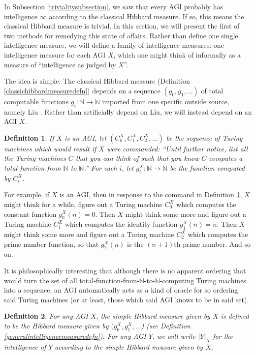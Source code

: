 \documentclass{article}
\newtheorem{definition}{Definition}
\begin{document}
In Subsection \ref{trivialitysubsection}, we saw that every AGI probably has
intelligence $\infty$ according to the classical Hibbard measure. If so, this
means the classical Hibbard measure is trivial. In this section, we will present
the first of two methods for remedying this state of affairs. Rather than define
one single intelligence measure, we will define a family of intelligence measures:
one intelligence measure for each AGI $X$, which one might think of informally as
a measure of ``intelligence as judged by $X$''.

The idea is simple. The classical Hibbard measure
(Definition \ref{classichibbardmeasuredefn}) depends on a sequence $(g_0,g_1,\ldots)$
of total computable functions $g_i:\mathbb N\to\mathbb N$ imported from one specific
outside source, namely Liu \cite{liu1960enumeration}. Rather than artificially depend
on Liu, we will instead depend on an AGI $X$.

\begin{definition}
\label{functionlistdefinition}
    If $X$ is an AGI, let $(C^X_0, C^X_1, C^X_2, \ldots)$ be the sequence of
    Turing machines which would result if $X$ were commanded: ``Until further
    notice, list all the Turing machines $C$ that you can think of such that
    you know $C$ computes a total function from $\mathbb N$ to $\mathbb N$.''
    For each $i$, let $g^X_i:\mathbb N\to\mathbb N$ be the function computed by
    $C^X_i$.
\end{definition}

For example, if $X$ is an AGI, then in response to the command in Definition
\ref{functionlistdefinition}, $X$ might think for a while, figure out a Turing
machine $C^X_0$ which computes the constant function $g^X_0(n)=0$. Then $X$
might think some more and figure out a Turing machine $C^X_1$ which computes
the identity function $g^X_1(n)=n$. Then $X$ might think some more and figure
out a Turing machine $C^X_2$ which computes the prime number function, so that
$g^X_2(n)$ is the $(n+1)$th prime number. And so on.

It is philosophically interesting that although there is no apparent ordering that
would turn the set of all total-function-from-$\mathbb N$-to-$\mathbb N$-computing
Turing machines into a sequence, an AGI automatically acts as a kind of oracle for
so ordering said Turing machines (or at least, those which said AGI knows to be in
said set).

\begin{definition}
    For any AGI $X$, the \emph{simple Hibbard measure given by $X$}
    is defined to be the Hibbard measure given by
    $(g^X_0,g^X_1,\ldots$) (see Definition \ref{generalintelligencemeasuredefn}).
    For any AGI $Y$, we will write $|Y|_X$ for the intelligence of $Y$
    according to the simple Hibbard measure given by $X$.
\end{definition}
\end{document}
